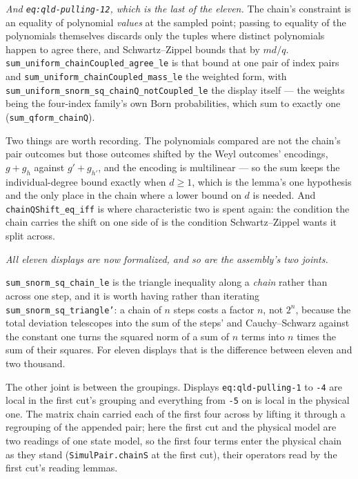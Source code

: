 \emph{And \texttt{eq:qld-pulling-12}, which is the last of the eleven.} The chain's constraint
is an equality of polynomial \emph{values} at the sampled point; passing to equality of the
polynomials themselves discards only the tuples where distinct polynomials happen to agree there,
and Schwartz--Zippel bounds that by $md/q$. \texttt{sum\_uniform\_chainCoupled\_agree\_le} is
that bound at one pair of index pairs and \texttt{sum\_uniform\_chainCoupled\_mass\_le} the
weighted form, with \texttt{sum\_uniform\_snorm\_sq\_chainQ\_notCoupled\_le} the display
itself --- the weights being the four-index family's own Born probabilities, which sum to exactly
one (\texttt{sum\_qform\_chainQ}).

Two things are worth recording. The polynomials compared are not the chain's pair outcomes but
those outcomes shifted by the Weyl outcomes' encodings, $g + g_h$ against $g' + g_{h'}$, and the
encoding is multilinear --- so the sum keeps the individual-degree bound exactly when $d \geq 1$,
which is the lemma's one hypothesis and the only place in the chain where a lower bound on $d$ is
needed. And \texttt{chainQShift\_eq\_iff} is where characteristic two is spent again: the
condition the chain carries the shift on one side of is the condition Schwartz--Zippel wants it
split across.

\emph{All eleven displays are now formalized, and so are the assembly's two joints.}

\texttt{sum\_snorm\_sq\_chain\_le} is the triangle inequality along a \emph{chain} rather
than across one step, and it is worth having rather than iterating
\texttt{sum\_snorm\_sq\_triangle'}: a chain of $n$ steps costs a factor $n$, not $2^n$,
because the total deviation telescopes into the sum of the steps' and Cauchy--Schwarz against the
constant one turns the squared norm of a sum of $n$ terms into $n$ times the sum of their squares.
For eleven displays that is the difference between eleven and two thousand.

The other joint is between the groupings. Displays \texttt{eq:qld-pulling-1} to \texttt{-4} are
local in the first cut's grouping and everything from \texttt{-5} on is local in the physical one.
The matrix chain carried each of the first four across by lifting it through a regrouping of the
appended pair; here the first cut and the physical model are two readings of one state model, so
the first four terms enter the physical chain as they stand (\texttt{SimulPair.chainS} at the
first cut), their operators read by the first cut's reading lemmas.

